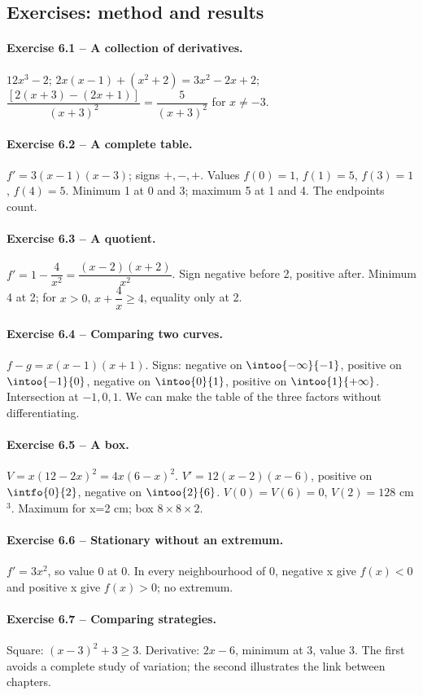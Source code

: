 \subsection*{Exercises: method and results}
\paragraph{Exercise 6.1 -- A collection of derivatives.} $12x^3-2$; $2x(x-1)+(x^2+2)=3x^2-2x+2$; $\dfrac{[2(x+3)-(2x+1)]}{(x+3)^2}=\dfrac{5}{(x+3)^2}$ for $x\ne-3$.
\paragraph{Exercise 6.2 -- A complete table.} $f\prime=3(x-1)(x-3)$; signs $+,-,+$. Values $f(0)=1$, $f(1)=5$, $f(3)=1$, $f(4)=5$. Minimum 1 at 0 and 3; maximum 5 at 1 and 4. The endpoints count.
\paragraph{Exercise 6.3 -- A quotient.} $f\prime =1-\dfrac{4}{x^2}=\dfrac{(x-2)(x+2)}{x^2}$. Sign negative before 2, positive after. Minimum 4 at 2; for $x>0$, $x+\dfrac{4}{x}\geq 4$, equality only at 2.
\paragraph{Exercise 6.4 -- Comparing two curves.} $f-g=x(x-1)(x+1)$. Signs: negative on $\intoo{-\infty}{-1}$, positive on $\intoo{-1}{0}$, negative on $\intoo{0}{1}$, positive on $\intoo{1}{+\infty}$. Intersection at $-1,0,1$. We can make the table of the three factors without differentiating.
\paragraph{Exercise 6.5 -- A box.} $V=x(12-2x)^2=4x(6-x)^2$. $V\prime=12(x-2)(x-6)$, positive on $\intfo{0}{2}$, negative on $\intoo{2}{6}$. $V(0)=V(6)=0$, $V(2)=128$ cm$^3$. Maximum for x=2 cm; box $8\times8\times2$.
\paragraph{Exercise 6.6 -- Stationary without an extremum.} $f\prime=3x^2$, so value 0 at 0. In every neighbourhood of 0, negative x give $f(x)<0$ and positive x give $f(x)>0$; no extremum.
\paragraph{Exercise 6.7 -- Comparing strategies.} Square: $(x-3)^2+3\geq3$. Derivative: $2x-6$, minimum at 3, value 3. The first avoids a complete study of variation; the second illustrates the link between chapters.
